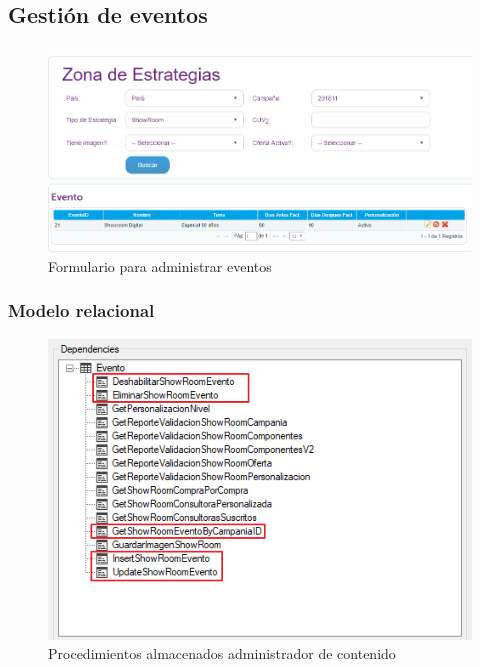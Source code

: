 \documentclass[a4paper,11pt]{paper}
\begin{document}
\subsection{Gestión de eventos}

\begin{figure}[h]
\centering
\includegraphics[width=1.0\textwidth]{imgs/Eventos/FormularioGestionEvento.png}
\caption{Formulario para administrar eventos}
\end{figure}

\newpage
\subsubsection{Modelo relacional}
\begin{figure}[h]
\centering
\includegraphics[width=1\textwidth]{imgs/Eventos/SPsAdm.png}
\caption{Procedimientos almacenados administrador de contenido}
\end{figure}
\end{document}
